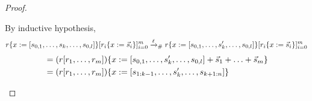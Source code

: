 \begin{proof}
\begin{enumerate}
  By inductive hypothesis,
  \begin{equation*}\begin{split}
    r\{x := [s_{0,1}, \hdots, s_k, \hdots, s_{0, l}]\} [r_i\{x := \vec{s}_i\}]_{i=0}^m
      & \mathrel{\xrightarrow{\ell}_{\mathtt{\#}}} r\{x := [s_{0,1}, \hdots, s'_k, \hdots, s_{0, l}]\}
      [r_i\{x := \vec{s}_i\}]_{i=0}^m \\
  \end{split}\end{equation*}
  \begin{equation*}\begin{split}
      & = (r [r_1, \hdots, r_m])\{x := [s_{0,1}, \hdots, s'_k, \hdots, s_{0, l}]
      + \vec{s}_1 + \hdots + \vec{s}_m\} \\
      & = (r [r_1, \hdots, r_m])\{x := [s_{1:k-1}, \hdots, s'_k, \hdots,
      s_{k+1:n}]\}\\
  \end{split}\end{equation*}
\end{enumerate}
\end{proof}

